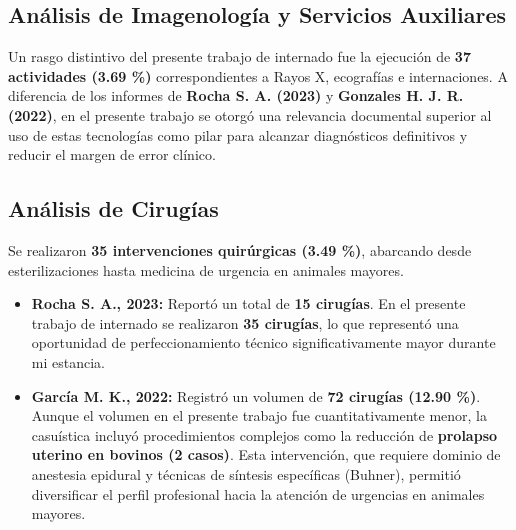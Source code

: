 	\subsection{Análisis de Imagenología y Servicios Auxiliares}

	Un rasgo distintivo del presente trabajo de internado fue la ejecución de \textbf{37 actividades (3.69 \%)} correspondientes a Rayos X, ecografías e internaciones. A diferencia de los informes de \textbf{Rocha S. A. (2023)} y \textbf{Gonzales H. J. R. (2022)}, en el presente trabajo se otorgó una relevancia documental superior al uso de estas tecnologías como pilar para alcanzar diagnósticos definitivos y reducir el margen de error clínico.

	\subsection{Análisis de Cirugías}

	Se realizaron \textbf{35 intervenciones quirúrgicas (3.49 \%)}, abarcando desde esterilizaciones hasta medicina de urgencia en animales mayores.

	\begin{itemize}
		\item \textbf{Rocha S. A., 2023:} Reportó un total de \textbf{15 cirugías}. En el presente trabajo de internado se realizaron \textbf{35 cirugías}, lo que representó una oportunidad de perfeccionamiento técnico significativamente mayor durante mi estancia.
		\item \textbf{García M. K., 2022:} Registró un volumen de \textbf{72 cirugías (12.90 \%)}. Aunque el volumen en el presente trabajo fue cuantitativamente menor, la casuística incluyó procedimientos complejos como la reducción de \textbf{prolapso uterino en bovinos (2 casos)}. Esta intervención, que requiere dominio de anestesia epidural y técnicas de síntesis específicas (Buhner), permitió diversificar el perfil profesional hacia la atención de urgencias en animales mayores.
	\end{itemize}
